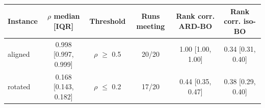 \begin{tabular}{lccccc}
\toprule
Instance & $\rho$ median [IQR] & Threshold & Runs meeting & Rank corr. ARD-BO & Rank corr. iso-BO \\
\midrule
aligned & 0.998 [0.997, 0.999] & $\rho$ $\geq$ 0.5 & 20/20 & 1.00 [1.00, 1.00] & 0.34 [0.31, 0.40] \\
rotated & 0.168 [0.143, 0.182] & $\rho$ $\leq$ 0.2 & 17/20 & 0.44 [0.35, 0.47] & 0.38 [0.29, 0.40] \\
\bottomrule
\end{tabular}
